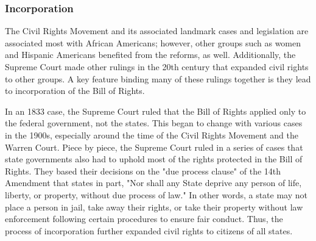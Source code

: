 \subsubsection{Incorporation}

The Civil Rights Movement and its associated landmark cases and legislation are
associated most with African Americans; however, other groups such as women and
Hispanic Americans benefited from the reforms, as well. Additionally, the
Supreme Court made other rulings in the 20th century that expanded civil rights
to other groups. A key feature binding many of these rulings together is they
lead to incorporation of the Bill of Rights.

In an 1833 case, the Supreme Court ruled that the Bill of Rights applied only to
the federal government, not the states. This began to change with various cases
in the 1900s, especially around the time of the Civil Rights Movement and the
Warren Court. Piece by piece, the Supreme Court ruled in a series of cases that
state governments also had to uphold most of the rights protected in the Bill of
Rights. They based their decisions on the "due process clause" of the 14th
Amendment that states in part, "Nor shall any State deprive any person of life,
liberty, or property, without due process of law." In other words, a state may
not place a person in jail, take away their rights, or take their property
without law enforcement following certain procedures to ensure fair conduct.
Thus, the process of incorporation further expanded civil rights to citizens of
all states.

\newpage
